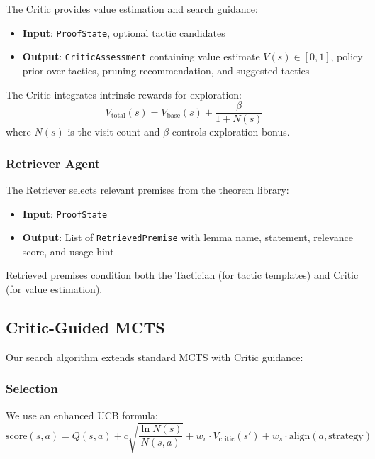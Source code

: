 \documentclass[11pt]{article}
\begin{document}
The Critic provides value estimation and search guidance:

\begin{itemize}
    \item \textbf{Input}: \texttt{ProofState}, optional tactic candidates
    \item \textbf{Output}: \texttt{CriticAssessment} containing value estimate $V(s) \in [0,1]$, policy prior over tactics, pruning recommendation, and suggested tactics
\end{itemize}

The Critic integrates intrinsic rewards for exploration:
\begin{equation}
    V_{\text{total}}(s) = V_{\text{base}}(s) + \frac{\beta}{1 + N(s)}
\end{equation}
where $N(s)$ is the visit count and $\beta$ controls exploration bonus.

\subsubsection{Retriever Agent}

The Retriever selects relevant premises from the theorem library:

\begin{itemize}
    \item \textbf{Input}: \texttt{ProofState}
    \item \textbf{Output}: List of \texttt{RetrievedPremise} with lemma name, statement, relevance score, and usage hint
\end{itemize}

Retrieved premises condition both the Tactician (for tactic templates) and Critic (for value estimation).

\subsection{Critic-Guided MCTS}

Our search algorithm extends standard MCTS with Critic guidance:

\subsubsection{Selection}

We use an enhanced UCB formula:
\begin{equation}
    \text{score}(s,a) = Q(s,a) + c\sqrt{\frac{\ln N(s)}{N(s,a)}} + w_v \cdot V_{\text{critic}}(s') + w_s \cdot \text{align}(a, \text{strategy})
\end{equation}
\end{document}
